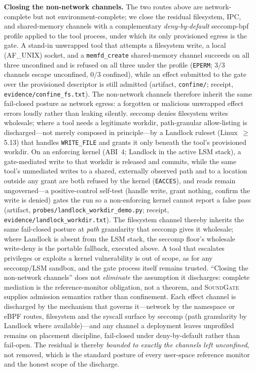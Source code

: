 \documentclass[10pt,journal,compsoc]{IEEEtran}
\newcommand{\sys}{\textsc{SoundGate}}
\begin{document}
\smallskip\noindent\textbf{Closing the non-network channels.} The two routes
above are network-complete but not environment-complete; we close the residual
filesystem, IPC, and shared-memory channels with a complementary
\emph{deny-by-default} seccomp-bpf profile applied to the tool process, under
which its only provisioned egress is the gate. A stand-in unwrapped tool that
attempts a filesystem write, a local (AF\_UNIX) socket, and a
\texttt{memfd\_create} shared-memory channel succeeds on all three unconfined
and is refused on all three under the profile (\texttt{EPERM}; $3/3$ channels
escape unconfined, $0/3$ confined), while an effect submitted to the gate over
the provisioned descriptor is still admitted (artifact, \texttt{confine/};
receipt, \texttt{evidence/confine\_fs.txt}). The non-network channels therefore
inherit the same fail-closed posture as network egress: a forgotten or malicious
unwrapped effect errors loudly rather than leaking silently. seccomp denies filesystem writes wholesale; where a tool needs a legitimate workdir, path-granular allow-listing is discharged---not merely composed in principle---by a Landlock ruleset (Linux~$\geq$5.13) that handles \texttt{WRITE\_FILE} and grants it only beneath the tool's provisioned workdir. On an enforcing kernel (ABI~4; Landlock in the active LSM stack), a gate-mediated write to that workdir is released and commits, while the same tool's unmediated writes to a shared, externally observed path and to a location outside any grant are both refused by the kernel (\texttt{EACCES}), and reads remain ungoverned---a positive-control self-test (handle write, grant nothing, confirm the write is denied) gates the run so a non-enforcing kernel cannot report a false pass (artifact, \texttt{probes/landlock\_workdir\_demo.py}; receipt, \texttt{evidence/landlock\_workdir.txt}). The filesystem channel thereby inherits the same fail-closed posture at \emph{path} granularity that seccomp gives it wholesale; where Landlock is absent from the LSM stack, the seccomp floor's wholesale write-deny is the portable fallback, executed above. A tool that escalates privileges or exploits
a kernel vulnerability is out of scope, as for any seccomp/LSM sandbox, and the
gate process itself remains trusted. ``Closing the non-network channels'' does not \emph{eliminate} the
assumption it discharges: complete mediation is the reference-monitor
obligation, not a theorem, and \sys{} supplies admission semantics rather than
confinement. Each effect channel is discharged by the mechanism that governs
it---network by the namespace or eBPF routes, filesystem and the syscall
surface by seccomp (path granularity by Landlock where available)---and any
channel a deployment leaves unprofiled remains on placement discipline,
fail-closed under deny-by-default rather than fail-open. The residual is thereby
\emph{bounded to exactly the channels left unconfined}, not removed, which is
the standard posture of every user-space reference monitor and the honest scope
of the discharge.
\end{document}
